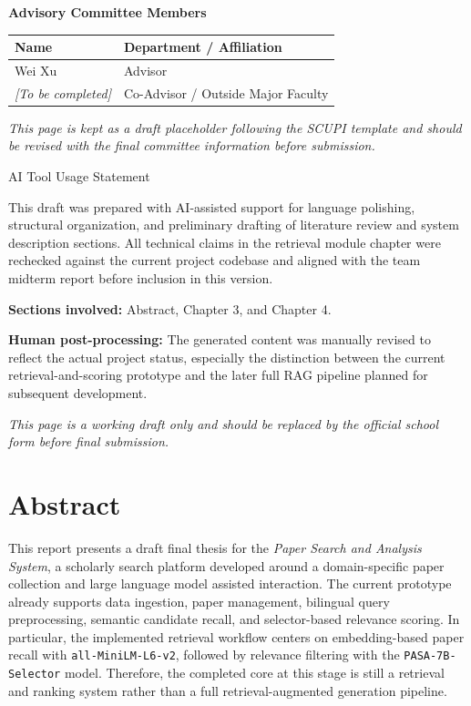 \documentclass[11pt,a4paper,oneside]{report}
\newcommand{\draftnote}[1]{\textit{#1}}
\begin{document}
\vspace{1.0cm}
\noindent\textbf{Advisory Committee Members}

\vspace{0.4cm}
\begin{tabularx}{\textwidth}{>{\raggedright\arraybackslash}X >{\raggedright\arraybackslash}X}
\toprule
Name & Department / Affiliation \\
\midrule
Wei Xu & Advisor \\
\draftnote{[To be completed]} & Co-Advisor / Outside Major Faculty \\
\bottomrule
\end{tabularx}

\vfill
\noindent\draftnote{This page is kept as a draft placeholder following the SCUPI template and should be revised with the final committee information before submission.}

\clearpage
\thispagestyle{empty}
\begin{center}
{\Large AI Tool Usage Statement\par}
\end{center}
\vspace{0.8cm}

\noindent This draft was prepared with AI-assisted support for language polishing,
structural organization, and preliminary drafting of literature review and system
description sections. All technical claims in the retrieval module chapter were
rechecked against the current project codebase and aligned with the team midterm
report before inclusion in this version.

\noindent\textbf{Sections involved:} Abstract, Chapter 3, and Chapter 4.

\noindent\textbf{Human post-processing:} The generated content was manually revised to
reflect the actual project status, especially the distinction between the current
retrieval-and-scoring prototype and the later full RAG pipeline planned for
subsequent development.

\noindent\draftnote{This page is a working draft only and should be replaced by the official school form before final submission.}

\clearpage
{}
\setcounter{page}{3}

\chapter*{Abstract}

This report presents a draft final thesis for the \textit{Paper Search and Analysis
System}, a scholarly search platform developed around a domain-specific paper
collection and large language model assisted interaction. The current prototype
already supports data ingestion, paper management, bilingual query preprocessing,
semantic candidate recall, and selector-based relevance scoring. In particular, the
implemented retrieval workflow centers on embedding-based paper recall with
\texttt{all-MiniLM-L6-v2}, followed by relevance filtering with the
\texttt{PASA-7B-Selector} model. Therefore, the completed core at this stage is still a
retrieval and ranking system rather than a full retrieval-augmented generation
pipeline.
\end{document}
